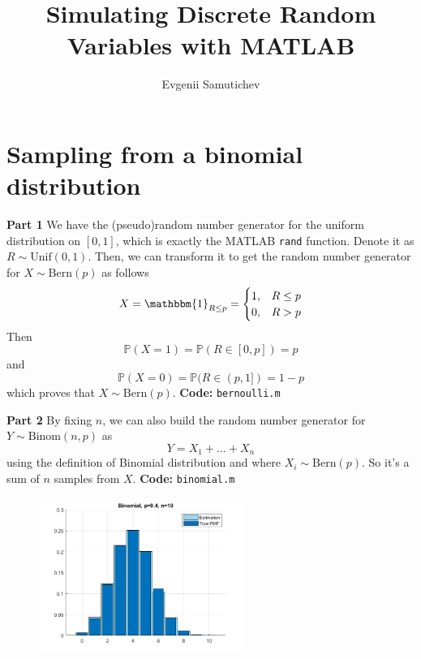 \documentclass[12pt]{article}
\title{Simulating Discrete Random Variables with MATLAB}
\author{Evgenii Samutichev}
\begin{document}
\maketitle

\section*{Sampling from a binomial distribution}

\setcounter{equation}{0}

\textbf{Part 1} We have the (pseudo)random number generator for the uniform distribution on $[0,1]$, which is exactly the MATLAB \verb|rand| function. Denote it as $R \sim \text{Unif}(0,1)$. Then, we can transform it to get the random number generator for $X \sim \text{Bern}(p)$ as follows 
\begin{equation}
    X = \mathbbm{1}_{R \leq  p} = \begin{cases}
        1, &R \leq p \\
        0, &R > p
    \end{cases}
\end{equation} 
Then 
\begin{equation}
    \mathbb{P}(X = 1) = \mathbb{P}(R \in [0, p]) =p 
\end{equation}
and 
\begin{equation}
    \mathbb{P}(X = 0) = \mathbb{P}(R \in (p, 1]) = 1 - p
\end{equation}
which proves that $X \sim \text{Bern}(p)$. \textbf{Code:} \verb|bernoulli.m|

\noindent \textbf{Part 2} By fixing $n$, we can also build the random number generator for $Y \sim \text{Binom}(n, p)$ as
\begin{equation}
    Y = X_1 + ... + X_n
\end{equation}
using the definition of Binomial distribution and where $X_i \sim \text{Bern}(p)$. So it's a sum of $n$ samples from $X$. \textbf{Code:} \verb|binomial.m|

\begin{figure}[h!]
    \centering
    \includegraphics[width=0.6\textwidth]{plot1.png}
\end{figure}
\end{document}
